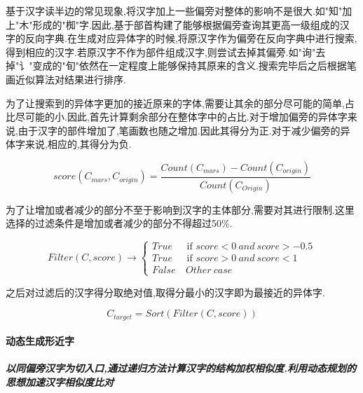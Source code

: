 \documentclass[
]{article}
\begin{document}
基于汉字读半边的常见现象,将汉字加上一些偏旁对整体的影响不是很大.如"知"加上"木"形成的"椥"字.因此,基于部首构建了能够根据偏旁查询其更高一级组成的汉字的反向字典.在生成对应异体字的时候,将原汉字作为偏旁在反向字典中进行搜索,得到相应的汉字.若原汉字不作为部件组成汉字,则尝试去掉其偏旁.如"询"去掉"⻈"变成的"旬"依然在一定程度上能够保持其原来的含义.搜索完毕后之后根据笔画近似算法对结果进行排序.

为了让搜索到的异体字更加的接近原来的字体,需要让其余的部分尽可能的简单,占比尽可能的小.因此,首先计算剩余部分在整体字中的占比.对于增加偏旁的异体字来说,由于汉字的部件增加了,笔画数也随之增加.因此其得分为正.对于减少偏旁的异体字来说,相应的,其得分为负.

\[score(C_{mars},C_{origin})=\frac{Count(C_{mars})-Count(C_{origin})}{Count(C_{Origin})}\]

为了让增加或者减少的部分不至于影响到汉字的主体部分,需要对其进行限制.这里选择的过滤条件是增加或者减少的部分不得超过50\%.

\[Filter(C,score)\to \begin{cases}

  True& \text{ if } score<0\ and\ score>-0.5 \\

  True& \text{ if } score>0\ and\ score<1 \\

  False&\ Other\ case

\end{cases}\]

之后对过滤后的汉字得分取绝对值,取得分最小的汉字即为最接近的异体字.

\[C_{target}=Sort(Filter(C,score))\]

\hypertarget{ux52a8ux6001ux751fux6210ux5f62ux8fd1ux5b57}{%
\paragraph{动态生成形近字}\label{ux52a8ux6001ux751fux6210ux5f62ux8fd1ux5b57}}

\hypertarget{ux4ee5ux540cux504fux65c1ux6c49ux5b57ux4e3aux5207ux5165ux53e3ux901aux8fc7ux9012ux5f52ux65b9ux6cd5ux8ba1ux7b97ux6c49ux5b57ux7684ux7ed3ux6784ux52a0ux6743ux76f8ux4f3cux5ea6ux5229ux7528ux52a8ux6001ux89c4ux5212ux7684ux601dux60f3ux52a0ux901fux6c49ux5b57ux76f8ux4f3cux5ea6ux6bd4ux5bf9}{%
\subparagraph{以同偏旁汉字为切入口,通过递归方法计算汉字的结构加权相似度.利用动态规划的思想加速汉字相似度比对}\label{ux4ee5ux540cux504fux65c1ux6c49ux5b57ux4e3aux5207ux5165ux53e3ux901aux8fc7ux9012ux5f52ux65b9ux6cd5ux8ba1ux7b97ux6c49ux5b57ux7684ux7ed3ux6784ux52a0ux6743ux76f8ux4f3cux5ea6ux5229ux7528ux52a8ux6001ux89c4ux5212ux7684ux601dux60f3ux52a0ux901fux6c49ux5b57ux76f8ux4f3cux5ea6ux6bd4ux5bf9}}
\end{document}
